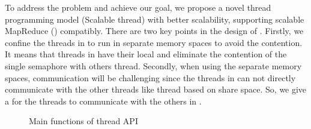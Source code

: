 

To address the problem and achieve our goal, we propose a novel thread programming model \myth (Scalable thread) with better scalability, supporting scalable MapReduce (\myds) compatibly.
There are two key points in the design of \myth.
Firstly, we confine the threads in \myth to run in separate memory spaces to avoid the contention.
It means that threads in \myth have their local  and eliminate the contention of the single semaphore with others thread.
Secondly, when using the separate memory spaces, communication will be challenging since the threads in \myth can not directly communicate with the other threads like thread based on share space.
So, we give a \chan for the threads to communicate with the others in \myth. 




\label{sec:pm:thread}
\begin{figure}[htpb]

\caption{Main functions of \myth thread API}
\label{fig:api:thread}
\end{figure}

